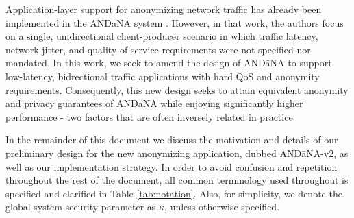 \documentclass[10pt]{article}
\begin{document}
Application-layer support for anonymizing network traffic has already been implemented in the {\sf AND\=aNA} system \cite{andana}. However, in that work, the authors focus on a single, unidirectional client-producer scenario in which traffic latency, network jitter, and quality-of-service requirements were not specified nor mandated. In this work, we seek to amend the design of {\sf AND\=aNA} to support low-latency, bidrectional traffic applications with hard QoS and anonymity requirements. Consequently, this new design seeks to attain equivalent anonymity and privacy guarantees of {\sf AND\=aNA} while enjoying significantly higher performance - two factors that are often inversely related in practice. 

In the remainder of this document we discuss the motivation and details of our preliminary design for the new anonymizing application, dubbed {\sf AND\=aNA-v2}, as well as our implementation strategy. In order to avoid confusion and repetition throughout the rest of the document, all common terminology used throughout is specified and clarified in Table \ref{tab:notation}. Also, for simplicity, we denote the global system security parameter as $\kappa$, unless otherwise specified. 
\end{document}
